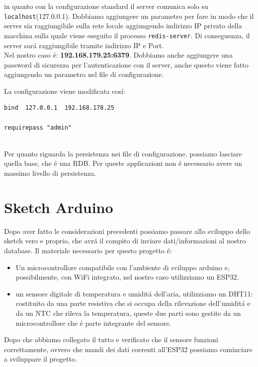 in quanto con la configurazione standard il server comunica solo su \texttt{localhost}(127.0.0.1).
Dobbiamo aggiungere un parametro per fare in modo che il server sia raggiungibile sulla rete locale aggiungendo indirizzo IP
privato della macchina sulla quale viene eseguito il processo \texttt{redis-server}.
Di conseguenza, il server sará raggiungibile tramite indirizzo IP e Port.\\
Nel nostro caso é: \textbf{192.168.179.25:6379}.
Dobbiamo anche aggiungere una password di sicurezza per l'autenticazione con il server, anche questo viene fatto
aggiungendo un parametro nel file di configurazione.

La configurazione viene modificata cosí:
\begin{lstlisting}[autogobble, style=redis-cli, language=...]
bind  127.0.0.1  192.168.178.25

requirepass "admin"\end{lstlisting}

\\

Per quanto riguarda la persistenza nei file di configurazione, possiamo lasciare quella base, che é una RDB.
Per queste applicazioni non é necessario avere un massimo livello di persistenza.

\section{Sketch Arduino}
Dopo aver fatto le considerazioni precedenti possiamo passare allo sviluppo dello sketch vero e proprio, che avrá il compito
di inviare dati/informazioni al nostro database.
Il materiale necessario per questo progetto é:
\begin{itemize}
    \item Un microcontrollore compatibile con l'ambiente di sviluppo arduino e, possibilmente, con WiFi integrato,
          nel nostro caso utilizziamo un ESP32.
    \item un sensore digitale di temperatura e umiditá dell'aria, utilizziamo un DHT11: costituito da una parte resistiva
    che si occupa della rilevazione dell'umiditá e da un NTC che rileva la temperatura, queste due parti sono gestite
    da un microcontrollore che é parte integrante del sensore.
\end{itemize}

Dopo che abbiamo collegato il tutto e verificato che il sensore funzioni correttamente, ovvero che mandi dei dati
coerenti all'ESP32 possiamo cominciare a sviluppare il progetto.

